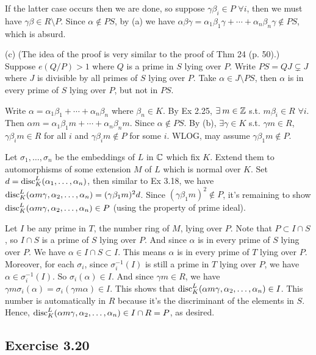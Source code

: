 \documentclass[../Marcus.tex]{subfiles}
\begin{document}
If the latter case occurs then we are done, so suppose $\gamma\beta_i\in P$ $\forall i$, then we must have $\gamma\beta\in R\setminus P$. Since $\alpha\notin PS$, by (a) we have $\alpha\beta\gamma=\alpha_1\beta_1\gamma+\cdots+\alpha_n\beta_n\gamma\notin PS$, which is absurd.

(c) (The idea of the proof is very similar to the proof of Thm 24 (p. 50).) Suppose $e(Q/P)>1$ where $Q$ is a prime in $S$ lying over $P$. Write $PS=QJ\varsubsetneq J$ where $J$ is divisible by all primes of $S$ lying over $P$. Take $\alpha\in J\setminus PS$, then $\alpha$ is in every prime of $S$ lying over $P$, but not in $PS$.

Write $\alpha=\alpha_1\beta_1+\cdots+\alpha_n\beta_n$ where $\beta_n\in K$. By Ex 2.25, $\exists m\in\ZZ$ s.t. $m\beta_i\in R$ $\forall i$. Then $\alpha m=\alpha_1\beta_1m+\cdots+\alpha_n\beta_nm$. Since $\alpha\notin PS$. By (b), $\exists\gamma\in K$ s.t. $\gamma m\in R$, $\gamma\beta_im\in R$ for all $i$ and $\gamma\beta_i m\notin P$ for some $i$. WLOG, may assume $\gamma\beta_1m\notin P$.

Let $\sigma_1,\ldots,\sigma_n$ be the embeddings of $L$ in $\mathbb{C}$ which fix $K$. Extend them to automorphisms of some extension $M$ of $L$ which is normal over $K$. Set $d=\operatorname{disc}^L_K(\alpha_1,\ldots,\alpha_n)$, then similar to Ex 3.18, we have $\operatorname{disc}^L_K(\alpha m\gamma,\alpha_2,\ldots,\alpha_n)=(\gamma\beta_1 m)^2d$. Since $(\gamma\beta_1m)^2\notin P$, it's remaining to show $\operatorname{disc}^L_K(\alpha m\gamma,\alpha_2,\ldots,\alpha_n)\in P$ (using the property of prime ideal). 

Let $I$ be any prime in $T$, the number ring of $M$, lying over $P$. Note that $P\subset I\cap S$, so $I\cap S$ is a prime of $S$ lying over $P$. And since $\alpha$ is in every prime of $S$ lying over $P$. We have $\alpha\in I\cap S\subset I$. This means $\alpha$ is in every prime of $T$ lying over $P$. Moreover, for each $\sigma_i$, since $\sigma_i^{-1}(I)$ is still a prime in $T$ lying over $P$, we have $\alpha\in \sigma_i^{-1}(I)$. So $\sigma_i(\alpha)\in I$. And since $\gamma m\in R$, we have $\gamma m\sigma_i(\alpha)=\sigma_i(\gamma m\alpha)\in I$. This shows that $\operatorname{disc}^L_K(\alpha m\gamma,\alpha_2,\ldots,\alpha_n)\in I$. This number is automatically in $R$ because it's the discriminant of the elements in $S$. Hence, $\operatorname{disc}^L_K(\alpha m\gamma,\alpha_2,\ldots,\alpha_n)\in I\cap R=P$, as desired.

\subsection*{Exercise 3.20}
\end{document}
